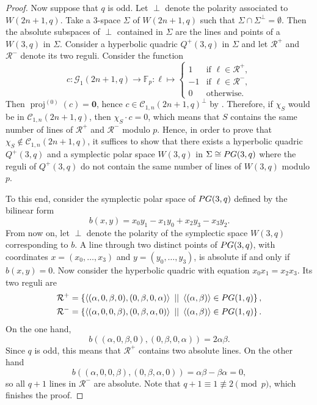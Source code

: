 \documentclass[a4paper]{article}
\theoremstyle{definition}
\newcommand{\FF}{\mathbb F}
\newcommand{\vspan}[1]{\left \langle #1 \right \rangle}
\newcommand{\sett}[2]{ \left\{ #1 \, \, || \, \, #2 \right \} }
\newcommand{\pg}{\textnormal{PG}}
\newcommand{\zero}{\mathbf 0}
\newcommand{\mc}{\mathcal C}
\newcommand{\mg}{\mathcal G}
\newcommand{\mr}{\mathcal R}
\DeclareMathOperator{\proj}{proj}
\begin{document}
\begin{proof}
 Now suppose that $q$ is odd.
 Let $\perp$ denote the polarity associated to $W(2n+1,q)$.
 Take a 3-space $\Sigma$ of $W(2n+1,q)$ such that $\Sigma \cap \Sigma^\perp = \emptyset$.
 Then the absolute subspaces of $\perp$ contained in $\Sigma$ are the lines and points of a $W(3,q)$ in $\Sigma$.
 Consider a hyperbolic quadric $Q^+(3,q)$ in $\Sigma$ and let $\mr^+$ and $\mr^-$ denote its two reguli.
 Consider the function
 \[
  c: \mg_1(2n+1,q) \to \FF_p: \ell \mapsto \begin{cases}
   1 & \text{if } \ell \in \mathcal R^+, \\
   -1 & \text{if } \ell \in \mathcal R^-, \\
   0 & \text{otherwise.}
  \end{cases}
 \]
 Then $\proj^{(0)}(c) = \zero$, hence $c \in \mc_{1,n}(2n+1,q)^\perp$ by .
 Therefore, if $\chi_S$ would be in $\mc_{1,n}(2n+1,q)$, then $\chi_S \cdot c = 0$, which means that $S$ contains the same number of lines of $\mathcal R^+$ and $\mathcal R^-$ modulo $p$.
 Hence, in order to prove that $\chi_S \notin \mc_{1,n}(2n+1,q)$, it suffices to show that there exists a hyperbolic quadric $Q^+(3,q)$ and a symplectic polar space $W(3,q)$ in $\Sigma \cong \pg(3,q)$ where the reguli of $Q^+(3,q)$ do not contain the same number of lines of $W(3,q)$ modulo $p$.
 
 To this end, consider the symplectic polar space of $\pg(3,q)$ defined by the bilinear form
 \[
  b(x,y) = x_0 y_1 - x_1 y_0 + x_2 y_3 - x_3 y_2.
 \]
 From now on, let $\perp$ denote the polarity of the symplectic space $W(3,q)$ corresponding to $b$.
 A line through two distinct points of $\pg(3,q)$, with coordinates $x=(x_0,\dots,x_3)$ and $y=(y_0,\dots,y_3)$, is absolute if and only if $b(x,y) = 0$.
 Now consider the hyperbolic quadric with equation $x_0 x_1 = x_2 x_3$.
 Its two reguli are
 \begin{align*}
  \mathcal R^+ &= \sett{\vspan{(\alpha,0,\beta,0), (0,\beta,0,\alpha)}}{ \vspan{(\alpha,\beta)} \in \pg(1,q)}, \\
  \mathcal R^- &= \sett{\vspan{(\alpha,0,0,\beta), (0,\beta,\alpha,0)}}{\vspan{(\alpha,\beta)} \in \pg(1,q)}.
 \end{align*}
 On the one hand,
 \[
  b\left((\alpha,0,\beta,0),(0,\beta,0,\alpha)\right)
  = 2 \alpha \beta.
 \]
 Since $q$ is odd, this means that $\mathcal R^+$ contains two absolute lines.
 On the other hand
 \[
  b\left((\alpha,0,0,\beta),(0,\beta,\alpha,0)\right) = \alpha \beta - \beta \alpha=0,
 \]
 so all $q+1$ lines in $\mathcal R^-$ are absolute.
 Note that $q+1 \equiv 1 \not \equiv 2 \pmod p$, which finishes the proof.
\end{proof}
\end{document}
